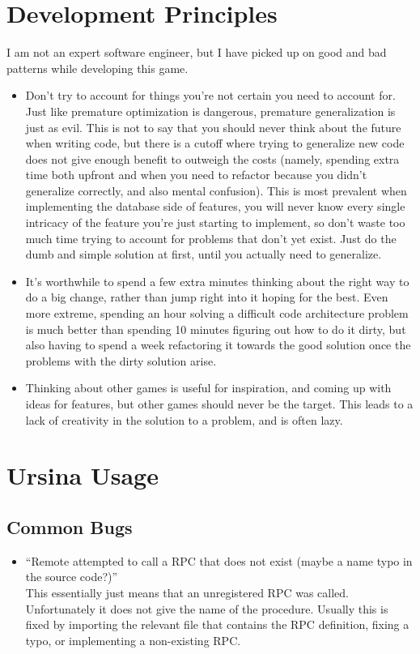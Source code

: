 \documentclass{article}
\begin{document}
\section{Development Principles}
I am not an expert software engineer, but I have picked up on good and bad patterns while developing
this game.
\begin{itemize}
    \item Don't try to account for things you're not certain you need to account for. Just like premature
        optimization is dangerous, premature generalization is just as evil. This is not to say that
        you should never think about the future when writing code, but there is a cutoff where trying
        to generalize new code does not give enough benefit to outweigh the costs (namely, spending
        extra time both upfront and when you need to refactor because you didn't generalize correctly,
        and also mental confusion). This is most prevalent when implementing the database side of
        features, you will never know every single intricacy of the feature you're just starting to
        implement, so don't waste too much time trying to account for problems that don't yet exist.
        Just do the dumb and simple solution at first, until you actually need to generalize.
    \item It's worthwhile to spend a few extra minutes thinking about the right way to do a big change,
        rather than jump right into it hoping for the best. Even more extreme, spending an hour
        solving a difficult code architecture problem is much better than spending 10 minutes figuring
        out how to do it dirty, but also having to spend a week refactoring it towards the good solution
        once the problems with the dirty solution arise.
    \item Thinking about other games is useful for inspiration, and coming up with ideas for features,
        but other games should never be the target. This leads to a lack of creativity in the solution
        to a problem, and is often lazy.
\end{itemize}


\section{Ursina Usage}
\subsection{Common Bugs}
\begin{itemize}
    \item ``Remote attempted to call a RPC that does not exist (maybe a name typo in the source code?)''\\
        This essentially just means that an unregistered RPC was called. Unfortunately it does not give
        the name of the procedure. Usually this is fixed by importing the relevant file that contains the
        RPC definition, fixing a typo, or implementing a non-existing RPC.
\end{itemize}
\end{document}
